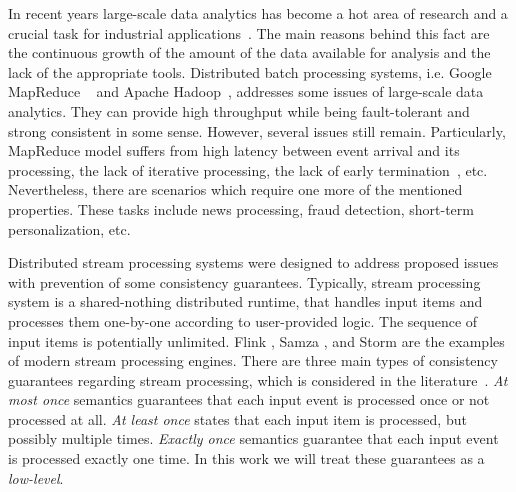 
\label {fs-phd-intro}

In recent years large-scale data analytics has become a hot area of research and a crucial task for industrial applications~\cite{Zou:2010:SRQ:1920841.1921012}. The main reasons behind this fact are the continuous growth of the amount of the data available for analysis and the lack of the appropriate tools. Distributed batch processing systems, i.e. Google MapReduce ~\cite{Dean:2008:MSD:1327452.1327492} and Apache Hadoop~\cite{hadoop2009hadoop}, addresses some issues of large-scale data analytics. They can provide high throughput while being fault-tolerant and strong consistent in some sense. However, several issues still remain. Particularly, MapReduce model suffers from high latency between event arrival and its processing, the lack of iterative processing, the lack of early termination~\cite{Doulkeridis:2014:SLA:2628707.2628782}, etc. Nevertheless, there are scenarios which require one more of the mentioned properties. These tasks include news processing, fraud detection, short-term personalization, etc.

Distributed stream processing systems were designed to address proposed issues with prevention of some consistency guarantees. Typically, stream processing system is a shared-nothing distributed runtime, that handles input items and processes them one-by-one according to user-provided logic. The sequence of input items is potentially unlimited. Flink \cite{carbone2015apache}, Samza \cite{Noghabi:2017:SSS:3137765.3137770}, and Storm \cite{apache:storm} are the examples of modern stream processing engines. There are three main types of consistency guarantees regarding stream processing, which is considered in the literature~\cite{Kulkarni:2015:THS:2723372.2742788, Akidau:2013:MFS:2536222.2536229, Carbone:2017:SMA:3137765.3137777}. {\em At most once} semantics guarantees that each input event is processed once or not processed at all. {\em At least once} states that each input item is processed, but possibly multiple times. {\em Exactly once} semantics guarantee that each input event is processed exactly one time. In this work we will treat these guarantees as a {\em low-level}. 

